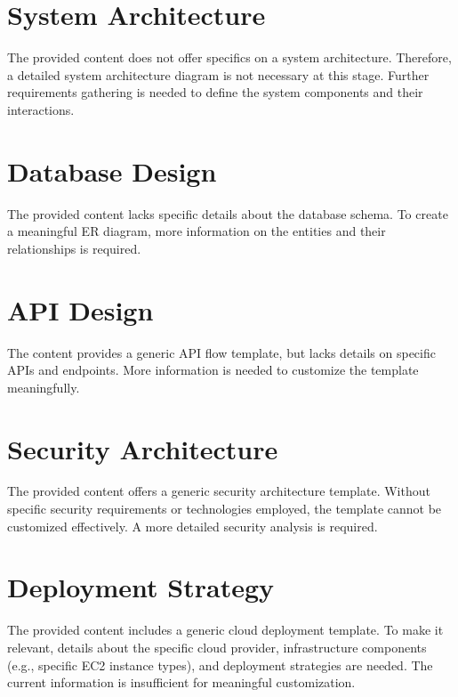 \documentclass[11pt,a4paper,oneside]{article}
\begin{document}
\section{System Architecture}
The provided content does not offer specifics on a system architecture.  Therefore, a detailed system architecture diagram is not necessary at this stage.  Further requirements gathering is needed to define the system components and their interactions.

\section{Database Design}
The provided content lacks specific details about the database schema.  To create a meaningful ER diagram, more information on the entities and their relationships is required.

\section{API Design}
The content provides a generic API flow template, but lacks details on specific APIs and endpoints.  More information is needed to customize the template meaningfully.

\section{Security Architecture}
The provided content offers a generic security architecture template.  Without specific security requirements or technologies employed, the template cannot be customized effectively.  A more detailed security analysis is required.

\section{Deployment Strategy}
The provided content includes a generic cloud deployment template.  To make it relevant, details about the specific cloud provider, infrastructure components (e.g., specific EC2 instance types), and deployment strategies are needed.  The current information is insufficient for meaningful customization.
\end{document}
